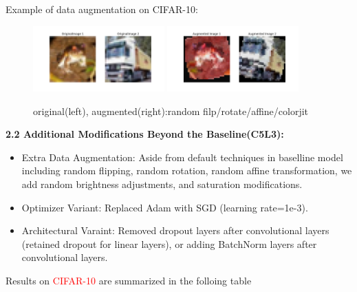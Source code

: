 \documentclass{article}
\begin{document}
\noindent Example of data augmentation on CIFAR-10:

\begin{figure}[htbp]
  \centering
  \includegraphics[width=0.45\textwidth]{fig/original.png} %
  \includegraphics[width=0.45\textwidth]{fig/augmented.png} %
  \caption{original(left), augmented(right):random filp/rotate/affine/colorjit } %
  \label{fig:original} %
\end{figure}


\noindent\textbf{2.2 Additional Modifications Beyond the Baseline(C5L3):}
\begin{itemize}
  \item Extra Data Augmentation: Aside from default techniques in baselline model including random flipping, random rotation, random affine transformation, we add random brightness adjustments, and saturation modifications.
  \item Optimizer Variant: Replaced Adam with SGD (learning rate=1e-3).
  \item Architectural Varaint: Removed dropout layers after convolutional layers (retained dropout for linear layers), or adding BatchNorm layers after convolutional layers.
\end{itemize}


\noindent Results on \textcolor{red}{CIFAR-10} are summarized in the folloing table
\end{document}
